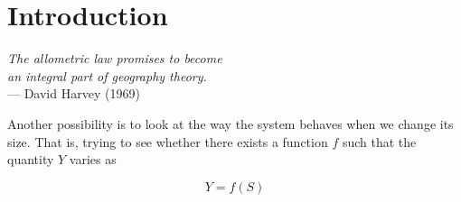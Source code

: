 \chapter{Introduction}
\label{chap:scaling_introduction}

\begin{flushright}{\slshape    
The allometric law promises to become\\
an integral part of geography theory.} \\ \medskip
--- David Harvey (1969)~\cite{Harvey:1969} 
\end{flushright}


Another possibility is to look at the way
the system behaves when we change its size. That is, trying to see whether there
exists a function $f$ such that the quantity $Y$ varies as

\begin{equation}
    Y = f(S)
\end{equation}

